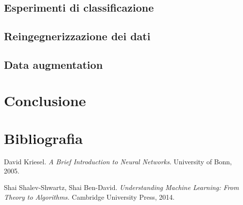 \documentclass[12pt, twoside, letterpaper]{report}
\begin{document}
		\section{Esperimenti di classificazione}
		\section{Reingegnerizzazione dei dati}
		\section{Data augmentation}

	\chapter*{Conclusione}	
	\chapter*{Bibliografia}
		\begin{enumerate}[label={[\arabic*]}]
			\item David Kriesel. \textit{A Brief Introduction to Neural Networks}. University of Bonn, 2005.
			\item Shai Shalev-Shwartz, Shai Ben-David. \textit{Understanding Machine Learning: From Theory to Algorithms.} Cambridge University Press, 2014.
		\end{enumerate}
	
\end{document}

